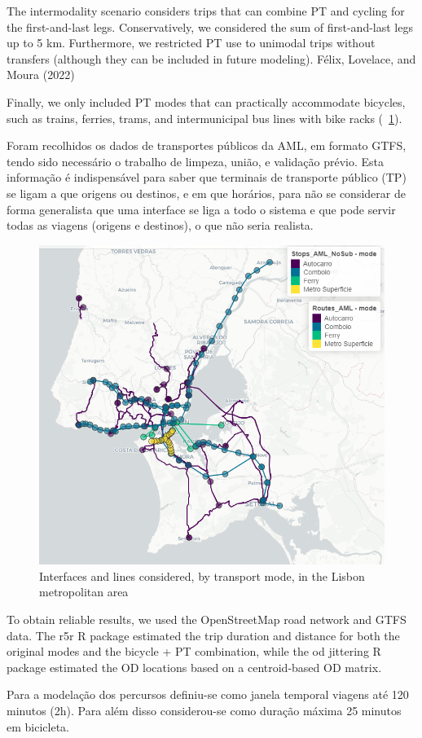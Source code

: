 \documentclass[runningheads]{llncs}
\begin{document}
The intermodality scenario considers trips that can combine PT and
cycling for the first-and-last legs. Conservatively, we considered the
sum of first-and-last legs up to 5 km. Furthermore, we restricted PT use
to unimodal trips without transfers (although they can be included in
future modeling). Félix, Lovelace, and Moura (2022)

Finally, we only included PT modes that can practically accommodate
bicycles, such as trains, ferries, trams, and intermunicipal bus lines
with bike racks (~\ref{fig:map1}).

Foram recolhidos os dados de transportes públicos da AML, em formato
GTFS, tendo sido necessário o trabalho de limpeza, união, e validação
prévio. Esta informação é indispensável para saber que terminais de
transporte público (TP) se ligam a que origens ou destinos, e em que
horários, para não se considerar de forma generalista que uma interface
se liga a todo o sistema e que pode servir todas as viagens (origens e
destinos), o que não seria realista.

\begin{figure}
\includegraphics[width=0.6\linewidth,]{img/map1} \caption{Interfaces and lines considered, by transport mode, in the Lisbon metropolitan area}\label{fig:map1}
\end{figure}

To obtain reliable results, we used the OpenStreetMap road network and
GTFS data. The r5r R package estimated the trip duration and distance
for both the original modes and the bicycle + PT combination, while the
od jittering R package estimated the OD locations based on a
centroid-based OD matrix.

Para a modelação dos percursos definiu-se como janela temporal viagens
até 120 minutos (2h). Para além disso considerou-se como duração máxima
25 minutos em bicicleta.
\end{document}
